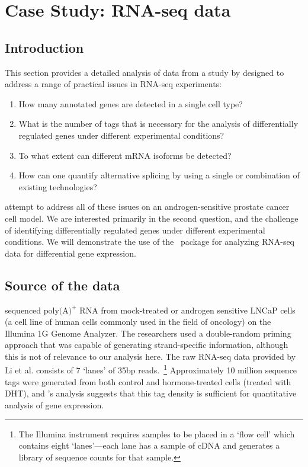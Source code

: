 
\section{Case Study: RNA-seq data}\label{li}
\subsection{Introduction}
This section provides a detailed analysis of data from a study by
\citet{Li08} designed to address a range of practical issues in
RNA-seq experiments:
\begin{enumerate}
\item How many annotated genes are detected in a single cell type?

\item What is the number of tags that is necessary for the analysis of
  differentially regulated genes under different experimental
  conditions?

\item To what extent can different mRNA isoforms be detected?

\item How can one quantify alternative splicing by using a single or
  combination of existing technologies?
\end{enumerate}
\citet{Li08} attempt to address all of these issues on an
androgen-sensitive prostate cancer cell model. We are interested
primarily in the second question, and the challenge of identifying
differentially regulated genes under different experimental
conditions. We will demonstrate the use of the \edgeR~package for
analyzing RNA-seq data for differential gene expression.

\subsection{Source of the data}
\citet{Li08} sequenced $\textrm{poly(A)}^+$ RNA from mock-treated or
androgen sensitive LNCaP cells (a cell line of human cells commonly
used in the field of oncology) on the Illumina 1G Genome Analyzer. The
researchers used a double-random priming approach that was capable of
generating strand-specific information, although this is not of
relevance to our analysis here. The raw RNA-seq data provided by Li et
al. consists of 7 `lanes' of 35bp reads.~\footnote{The Illumina
  instrument requires samples to be placed in a `flow cell' which
  contains eight `lanes'---each lane has a sample of cDNA and
  generates a library of sequence counts for that sample.}
Approximately 10 million sequence tags were generated from both
control and hormone-treated cells (treated with DHT), and
\citet{Li08}'s analysis suggests that this tag density is sufficient
for quantitative analysis of gene expression.

